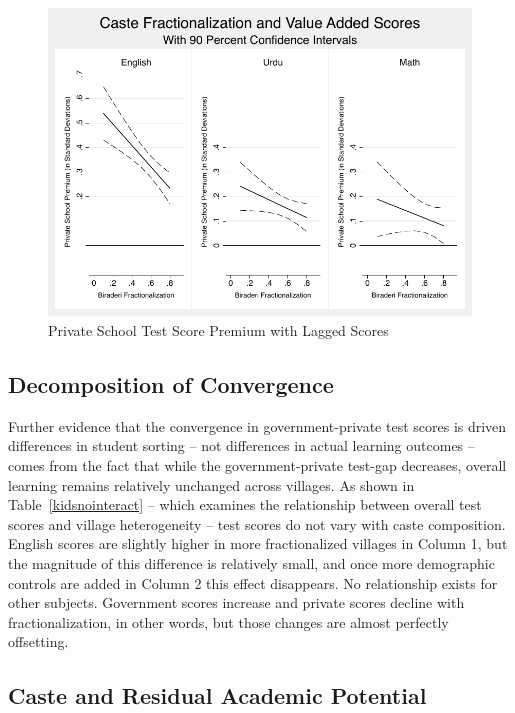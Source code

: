 \documentclass[Eubank_pk_ethnic_sorting.tex]{subfiles}
\begin{document}
\begin{figure}[h]
	\caption{Private School Test Score Premium with Lagged Scores}\label{kidscombined}
	\centering
	\includegraphics[scale=0.8]{../results/kids_combined.pdf}
\end{figure}


\subsection{Decomposition of Convergence}\label{village_level_outcomes}

Further evidence that the convergence in government-private test scores is driven differences in student sorting -- not differences in actual learning outcomes -- comes from the fact that while the government-private test-gap decreases, overall learning remains relatively unchanged across villages. As shown in Table~\ref{kidsnointeract} -- which examines the relationship between overall test scores and village heterogeneity -- test scores do not vary with caste composition. English scores are slightly higher in more fractionalized villages in Column 1, but the magnitude of this difference is relatively small, and once more demographic controls are added in Column 2 this effect disappears. No relationship exists for other subjects. Government scores increase and private scores decline with fractionalization, in other words, but those changes are almost perfectly offsetting. 





\subsection{Caste and Residual Academic Potential}\label{residual_potential}
\end{document}
